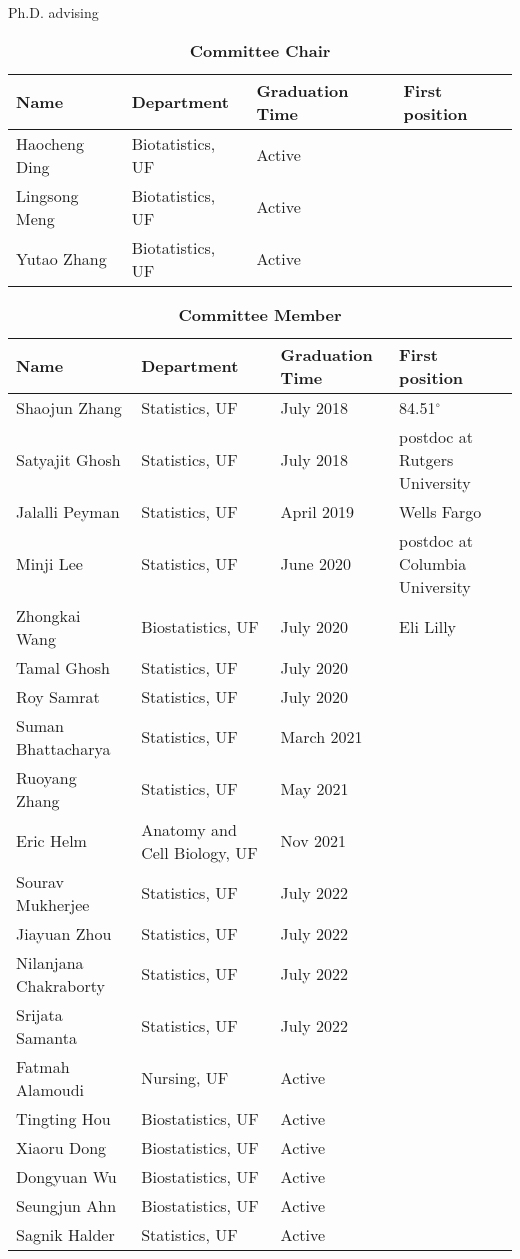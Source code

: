 \documentclass{resume} %
\begin{document}
\begin{rSection}{Ph.D. advising}

\begin{table}[htp]
\caption*{\textbf{Committee Chair}}
\begin{center}
\begin{tabular}{l l l l}
\hline
\hline
Name & Department & Graduation Time & First position \\
\hline
Haocheng Ding & Biotatistics, UF & Active &  \\
Lingsong Meng & Biotatistics, UF & Active &  \\
Yutao Zhang & Biotatistics, UF & Active &  \\
\hline
\hline
\end{tabular}
\end{center}
\label{default}
\end{table}%


\begin{table}[htp]
\caption*{\textbf{Committee Member}}
\begin{center}
\begin{tabular}{l l l l}
\hline
\hline
Name & Department & Graduation Time & First position \\
\hline
Shaojun Zhang & Statistics, UF & July 2018 & 84.51$^\circ$ \\
Satyajit Ghosh & Statistics, UF & July 2018 & postdoc at Rutgers University \\
Jalalli Peyman & Statistics, UF & April 2019 & Wells Fargo \\
Minji Lee & Statistics, UF & June 2020 &postdoc at Columbia University\\
Zhongkai Wang &  Biostatistics, UF & July 2020 & Eli Lilly \\
Tamal Ghosh & Statistics, UF & July 2020 & \\
Roy Samrat & Statistics, UF & July 2020 & \\
Suman Bhattacharya & Statistics, UF & March 2021 & \\
Ruoyang Zhang & Statistics, UF & May 2021 & \\
Eric Helm &  Anatomy and Cell Biology, UF & Nov 2021 & \\
Sourav Mukherjee & Statistics, UF & July 2022 & \\
Jiayuan Zhou & Statistics, UF & July 2022 & \\
Nilanjana Chakraborty & Statistics, UF & July 2022 & \\
Srijata Samanta & Statistics, UF & July 2022 & \\
Fatmah Alamoudi & Nursing, UF & Active & \\
Tingting Hou & Biostatistics, UF & Active & \\
Xiaoru Dong & Biostatistics, UF & Active & \\
Dongyuan Wu & Biostatistics, UF & Active & \\
Seungjun Ahn & Biostatistics, UF & Active & \\
Sagnik Halder & Statistics, UF & Active & \\
\hline
\hline
\end{tabular}
\end{center}
\label{default}
\end{table}%


\end{rSection}
\end{document}
